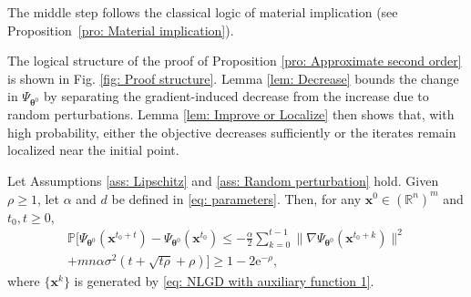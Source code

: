 \documentclass{siamart251216}
\begin{document}
The middle step follows the classical logic of material implication (see Proposition~\ref{pro: Material implication}).

The logical structure of the proof of Proposition \ref{pro: Approximate second order} is shown in Fig. \ref{fig: Proof structure}. Lemma \ref{lem: Decrease} bounds the change in $\Psi_{\boldsymbol{\theta}^{0}}$ by separating the gradient-induced decrease from the increase due to random perturbations. Lemma \ref{lem: Improve or Localize} then shows that, with high probability, either the objective decreases sufficiently or the iterates remain localized near the initial point.

\begin{lemma}
\label{lem: Decrease}
    Let Assumptions \ref{ass: Lipschitz} and \ref{ass: Random perturbation} hold. Given $\rho\geq1$, let $\alpha$ and $d$ be defined in \eqref{eq: parameters}. Then, for any $\mathbf{x}^{0}\in(\mathbb{R}^{n})^{m}$ and $t_{0},t\geq0$,
    \begin{multline}
    \label{eq: Decomposition of the change}
    \mathbb{P}\Bigg[\Psi_{\boldsymbol{\theta}^{0}}(\mathbf{x}^{t_{0}+t})-\Psi_{\boldsymbol{\theta}^{0}}(\mathbf{x}^{t_{0}})\leq-\frac{\alpha}{2}\sum_{k=0}^{t-1}\|\nabla\Psi_{\boldsymbol{\theta}^{0}}(\mathbf{x}^{t_{0}+k})\|^{2}\\
    +mn\alpha\sigma^{2}(t+\sqrt{t\rho}+\rho)\Bigg]\geq1-2\mathrm{e}^{-\rho},
    \end{multline}
    where $\{\mathbf{x}^{k}\}$ is generated by \eqref{eq: NLGD with auxiliary function 1}.
\end{lemma}
\end{document}
